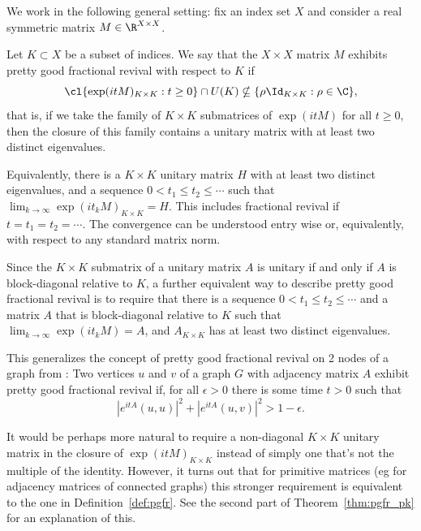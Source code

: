 We work in the following general setting: fix an index set $X$ and consider a real symmetric matrix $M \in \R^{X\times X}$. 

\begin{defi}\label{def:pgfr}
Let $K \subset X$ be a subset of indices. We say that the $X \times X$ matrix $M$ exhibits pretty good fractional revival with respect to $K$ if 
\[ \cl \{ \exp(i t M)_{K \times K} : t \geq 0\} \cap U(K) \nsubseteq \{ \rho \Id_{K \times K} : \rho \in \C\}, \]
that is, if we take the family of  $K\times K$ submatrices of $\exp(i t M)$ for all $t \geq 0$, then the closure of this family contains a unitary matrix with at least two distinct eigenvalues.

Equivalently, there is a $K \times K$ unitary matrix $H$ with at least two distinct eigenvalues, and a sequence $0 < t_1 \leq t_2 \leq  \cdots$ such that $\lim_{k \to \infty} \exp(i t_k M)_{K \times K} = H$. This includes fractional revival if $t = t_1 = t_2 = \cdots$. The convergence can be understood entry wise or, equivalently, with respect to any standard matrix norm.

Since the $K \times K$ submatrix of a unitary matrix $A$ is unitary if and only if $A$ is block-diagonal relative to $K$, a further equivalent way to describe pretty good fractional revival is to require that there is a sequence $0 < t_1 \leq t_2 \leq \cdots$ and a matrix $A$ that is block-diagonal relative to $K$ such that $\lim_{k\to \infty} \exp(it_k M) = A$, and $A_{K\times K}$ has at least two distinct eigenvalues.

\end{defi}

\begin{rema}
This generalizes the concept of pretty good fractional revival on 2 nodes of a graph from \cite{chan2020approximate}:
Two vertices $u$ and $v$ of a graph $G$ with adjacency matrix $A$ exhibit pretty good fractional revival if, for all $\epsilon>0$ there is some time $t>0$ such that
\[
|e^{itA}(u,u)|^2+|e^{itA}(u,v)|^2 > 1-\epsilon.
\]
\end{rema}

\begin{rema}
It would be perhaps more natural to require a non-diagonal $K \times K$ unitary matrix in the closure of $\exp(it M)_{K \times K}$ instead of simply one that's not the multiple of the identity. However, it turns out that for primitive matrices (eg for adjacency matrices of connected graphs) this stronger requirement is equivalent to the one in Definition~\ref{def:pgfr}. See the second part of Theorem~\ref{thm:pgfr_pk} for an explanation of this.
\end{rema}

